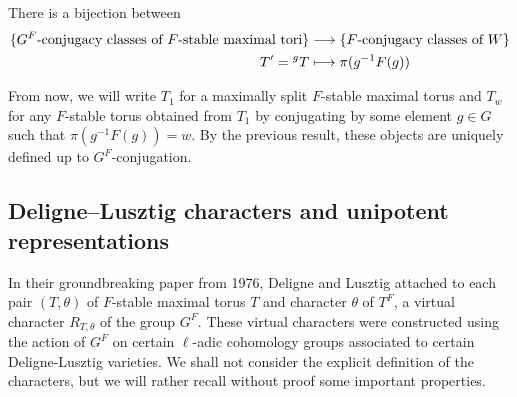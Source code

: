 \begin{lemma}
    There is a bijection between
    \begin{align*}
        \{G^F\text{-conjugacy classes of $F$-stable maximal tori}\}&\longrightarrow\{F\text{-conjugacy classes of }W\}\\
        T'=\prescript{g}{}{T}&\longmapsto \pi(g^{-1}F(g))
    \end{align*}
\end{lemma}

From now, we will write $T_1$ for a maximally split $F$-stable maximal torus and $T_w$ for any $F$-stable torus obtained from $T_1$ by conjugating by some element $g\in G$ such that $\pi(g^{-1}F(g))=w$. By the previous result, these objects are uniquely defined up to $G^F$-conjugation.

\subsection{Deligne--Lusztig characters and unipotent representations}

In their groundbreaking paper from 1976, Deligne and Lusztig attached to each pair $(T,\theta)$ of $F$-stable maximal torus $T$ and character $\theta$ of $T^F$, a virtual character $R_{T,\theta}$ of the group $G^F$. These virtual characters were constructed using the action of $G^F$ on certain $\ell$-adic cohomology groups associated to certain Deligne-Lusztig varieties. We shall not consider the explicit definition of the characters, but we will rather recall without proof some important properties. 

